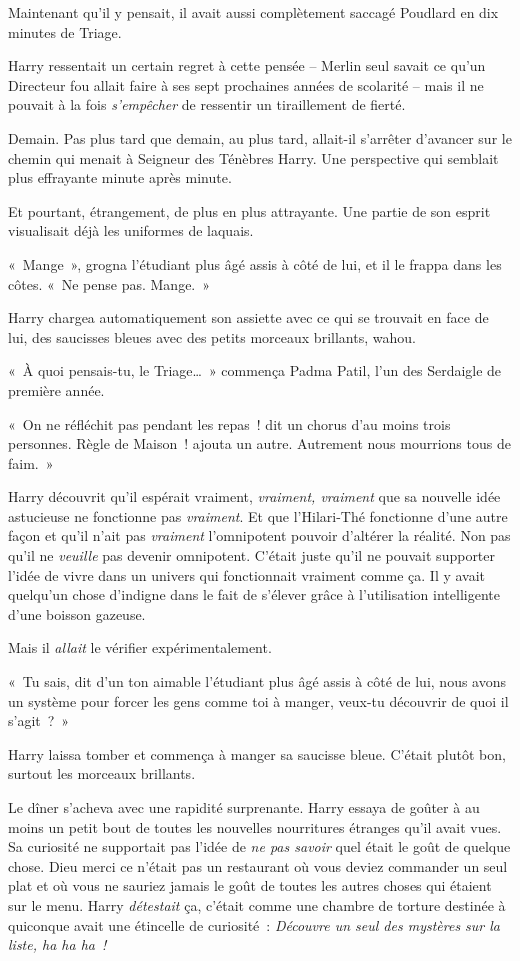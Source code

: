 Maintenant qu'il y pensait, il avait aussi complètement saccagé Poudlard en dix minutes de Triage.

Harry ressentait un certain regret à cette pensée -- Merlin seul savait ce qu'un Directeur fou allait faire à ses sept prochaines années de scolarité -- mais il ne pouvait à la fois \emph{s'empêcher} de ressentir un tiraillement de fierté.

Demain. Pas plus tard que demain, au plus tard, allait-il s'arrêter d'avancer sur le chemin qui menait à Seigneur des Ténèbres Harry. Une perspective qui semblait plus effrayante minute après minute.

Et pourtant, étrangement, de plus en plus attrayante. Une partie de son esprit visualisait déjà les uniformes de laquais.

«~Mange~», grogna l'étudiant plus âgé assis à côté de lui, et il le frappa dans les côtes. «~Ne pense pas. Mange.~»

Harry chargea automatiquement son assiette avec ce qui se trouvait en face de lui, des saucisses bleues avec des petits morceaux brillants, wahou.

«~À quoi pensais-tu, le Triage…~» commença Padma Patil, l'un des Serdaigle de première année.

«~On ne réfléchit pas pendant les repas~! dit un chorus d'au moins trois personnes. Règle de Maison~! ajouta un autre. Autrement nous mourrions tous de faim.~»

Harry découvrit qu'il espérait vraiment, \emph{vraiment, vraiment} que sa nouvelle idée astucieuse ne fonctionne pas \emph{vraiment}. Et que l'Hilari-Thé fonctionne d'une autre façon et qu'il n'ait pas \emph{vraiment} l'omnipotent pouvoir d'altérer la réalité. Non pas qu'il ne \emph{veuille} pas devenir omnipotent. C'était juste qu'il ne pouvait supporter l'idée de vivre dans un univers qui fonctionnait vraiment comme ça. Il y avait quelqu'un chose d'indigne dans le fait de s'élever grâce à l'utilisation intelligente d'une boisson gazeuse.

Mais il \emph{allait} le vérifier expérimentalement.

«~Tu sais, dit d'un ton aimable l'étudiant plus âgé assis à côté de lui, nous avons un système pour forcer les gens comme toi à manger, veux-tu découvrir de quoi il s'agit~?~»

Harry laissa tomber et commença à manger sa saucisse bleue. C'était plutôt bon, surtout les morceaux brillants.

Le dîner s'acheva avec une rapidité surprenante. Harry essaya de goûter à au moins un petit bout de toutes les nouvelles nourritures étranges qu'il avait vues. Sa curiosité ne supportait pas l'idée de \emph{ne pas savoir} quel était le goût de quelque chose. Dieu merci ce n'était pas un restaurant où vous deviez commander un seul plat et où vous ne sauriez jamais le goût de toutes les autres choses qui étaient sur le menu. Harry \emph{détestait} ça, c'était comme une chambre de torture destinée à quiconque avait une étincelle de curiosité~: \emph{Découvre un seul des mystères sur la liste, ha ha ha~!}

